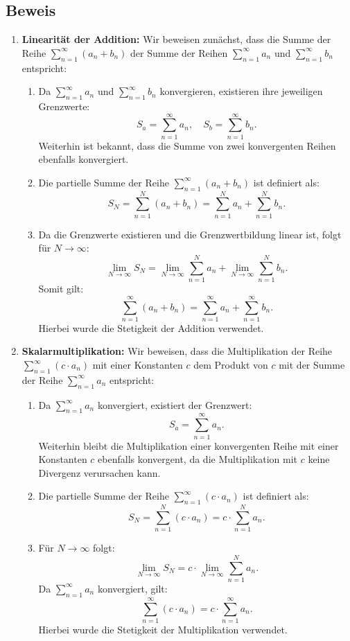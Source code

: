 \documentclass[11pt]{article}
\begin{document}
\subsection*{Beweis}
\begin{enumerate}
    \item \textbf{Linearität der Addition:} Wir beweisen zunächst, dass die Summe der Reihe \(\sum_{n=1}^\infty (a_n + b_n)\) der Summe der Reihen \(\sum_{n=1}^\infty a_n\) und \(\sum_{n=1}^\infty b_n\) entspricht:
    \begin{enumerate}
        \item Da \(\sum_{n=1}^\infty a_n\) und \(\sum_{n=1}^\infty b_n\) konvergieren, existieren ihre jeweiligen Grenzwerte:
        \[
        S_a = \sum_{n=1}^\infty a_n, \quad S_b = \sum_{n=1}^\infty b_n.
        \]
        Weiterhin ist bekannt, dass die Summe von zwei konvergenten Reihen ebenfalls konvergiert.
        \item Die partielle Summe der Reihe \(\sum_{n=1}^\infty (a_n + b_n)\) ist definiert als:
        \[
        S_N = \sum_{n=1}^N (a_n + b_n) = \sum_{n=1}^N a_n + \sum_{n=1}^N b_n.
        \]
        \item Da die Grenzwerte existieren und die Grenzwertbildung linear ist, folgt für \(N \to \infty\):
        \[
        \lim_{N \to \infty} S_N = \lim_{N \to \infty} \sum_{n=1}^N a_n + \lim_{N \to \infty} \sum_{n=1}^N b_n.
        \]
        Somit gilt:
        \[
        \sum_{n=1}^\infty (a_n + b_n) = \sum_{n=1}^\infty a_n + \sum_{n=1}^\infty b_n.
        \]
        Hierbei wurde die Stetigkeit der Addition verwendet.
    \end{enumerate}

    \item \textbf{Skalarmultiplikation:} Wir beweisen, dass die Multiplikation der Reihe \(\sum_{n=1}^\infty (c \cdot a_n)\) mit einer Konstanten \( c \) dem Produkt von \( c \) mit der Summe der Reihe \(\sum_{n=1}^\infty a_n\) entspricht:
    \begin{enumerate}
        \item Da \(\sum_{n=1}^\infty a_n\) konvergiert, existiert der Grenzwert:
        \[
        S_a = \sum_{n=1}^\infty a_n.
        \]
        Weiterhin bleibt die Multiplikation einer konvergenten Reihe mit einer Konstanten \( c \) ebenfalls konvergent, da die Multiplikation mit \( c \) keine Divergenz verursachen kann.
        \item Die partielle Summe der Reihe \(\sum_{n=1}^\infty (c \cdot a_n)\) ist definiert als:
        \[
        S_N = \sum_{n=1}^N (c \cdot a_n) = c \cdot \sum_{n=1}^N a_n.
        \]
        \item Für \(N \to \infty\) folgt:
        \[
        \lim_{N \to \infty} S_N = c \cdot \lim_{N \to \infty} \sum_{n=1}^N a_n.
        \]
        Da \(\sum_{n=1}^\infty a_n\) konvergiert, gilt:
        \[
        \sum_{n=1}^\infty (c \cdot a_n) = c \cdot \sum_{n=1}^\infty a_n.
        \]
        Hierbei wurde die Stetigkeit der Multiplikation verwendet.
    \end{enumerate}
\end{enumerate}
\end{document}
